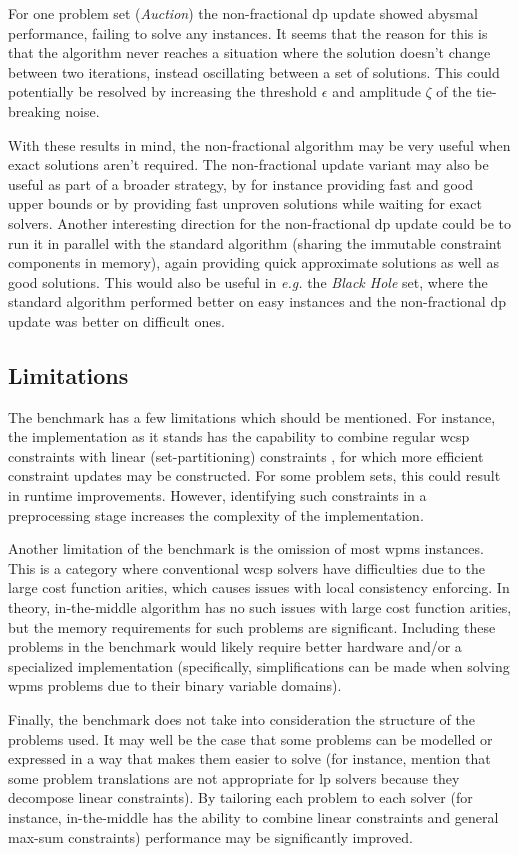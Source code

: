 For one problem set (\emph{Auction}) the non-fractional \gls{dp} update showed abysmal performance, failing to solve any instances.
It seems that the reason for this is that the algorithm never reaches a situation where the solution doesn't change between two iterations, instead oscillating between a set of solutions.
This could potentially be resolved by increasing the threshold \(\epsilon\) and amplitude \(\zeta\) of the tie-breaking noise.

With these results in mind, the non-fractional algorithm may be very useful when exact solutions aren't required.
The non-fractional update variant may also be useful as part of a broader strategy, by for instance providing fast and good upper bounds or by providing fast unproven solutions while waiting for exact solvers.
Another interesting direction for the non-fractional \gls{dp} update could be to run it in parallel with the standard algorithm (sharing the immutable constraint components in memory), again providing quick approximate solutions as well as good solutions.
This would also be useful in \emph{e.g.} the \emph{Black Hole} set, where the standard algorithm performed better on easy instances and the non-fractional \gls{dp} update was better on difficult ones.

\subsection{Limitations}
The benchmark has a few limitations which should be mentioned.
For instance, the implementation as it stands has the capability to combine regular \gls{wcsp} constraints with linear (set-partitioning) constraints \parencite[\pno~102]{Wedelin08}, for which more efficient constraint updates may be constructed.
For some problem sets, this could result in runtime improvements.
However, identifying such constraints in a preprocessing stage increases the complexity of the implementation.

Another limitation of the benchmark is the omission of most \gls{wpms} instances.
This is a category where conventional \gls{wcsp} solvers have difficulties due to the large cost function arities, which causes issues with local consistency enforcing.
In theory, in-the-middle algorithm has no such issues with large cost function arities, but the memory requirements for such problems are significant.
Including these problems in the benchmark would likely require better hardware and/or a specialized implementation (specifically, simplifications can be made when solving \gls{wpms} problems due to their binary variable domains).

Finally, the benchmark does not take into consideration the structure of the problems used.
It may well be the case that some problems can be modelled or expressed in a way that makes them easier to solve (for instance, \textcite{deGivry14} mention that some problem translations are not appropriate for \gls{lp} solvers because they decompose linear constraints).
By tailoring each problem to each solver (for instance, in-the-middle has the ability to combine linear constraints and general max-sum constraints) performance may be significantly improved.

